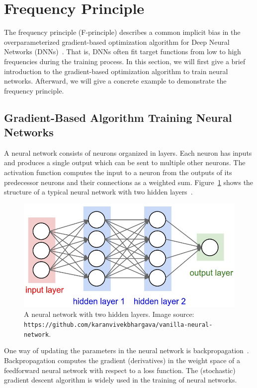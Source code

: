 \documentclass[letterpaper,12pt]{article}
\begin{document}
\section{Frequency Principle}
The frequency principle (F-principle) describes a common implicit bias in the overparameterized gradient-based optimization algorithm for Deep Neural Networks (DNNs)~\cite{Xu_2020}. That is, DNNs often fit target functions from low to high frequencies during the training process. In this section, we will first give a brief introduction to the gradient-based optimization algorithm to train neural networks. Afterward, we will give a concrete example to demonstrate the frequency principle.

\subsection{Gradient-Based Algorithm Training Neural Networks}
A neural network consists of neurons organized in layers. Each neuron has inputs and produces a single output which can be sent to multiple other neurons. The activation function computes the input to a neuron from the outputs of its predecessor neurons and their connections as a weighted sum. Figure~\ref{fig:3} shows the structure of a typical neural network with two hidden layers~\cite{enwiki:1020987696}.
\begin{figure}
\centering
\includegraphics[scale=0.4]{neural_net2.jpeg}
\caption{A neural network with two hidden layers. Image source: \texttt{https://github.com/karanvivekbhargava/vanilla-neural-network}.}\label{fig:3}
\end{figure}


One way of updating the parameters in the neural network is backpropagation~\cite{lecun1988theoretical}. Backpropagation computes the gradient (derivatives) in the weight space of a feedforward neural network with respect to a loss function. The (stochastic) gradient descent algorithm is widely used in the training of neural networks.
\end{document}
